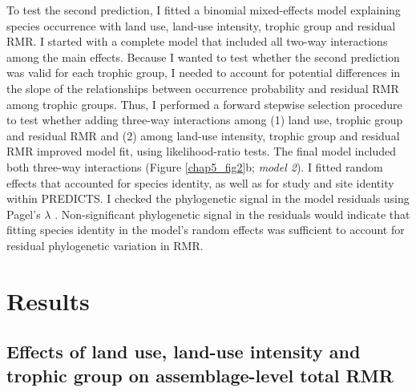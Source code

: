 To test the second prediction, I fitted a binomial mixed-effects model explaining species occurrence with land use, land-use intensity, trophic group and residual RMR. I started with a complete model that included all two-way interactions among the main effects. Because I wanted to test whether the second prediction was valid for each trophic group, I needed to account for potential differences in the slope of the relationships between occurrence probability and residual RMR among trophic groups. Thus, I performed a forward stepwise selection procedure to test whether adding three-way interactions among (1) land use, trophic group and residual RMR and (2) among land-use intensity, trophic group and residual RMR improved model fit, using likelihood-ratio tests. The final model included both three-way interactions (Figure \ref{chap5_fig2}b; \textit{model 2}). I fitted random effects that accounted for species identity, as well as for study and site identity within PREDICTS. I checked the phylogenetic signal in the model residuals using Pagel’s $\lambda$ \citep{Pagel1999}. Non-significant phylogenetic signal in the residuals would indicate that fitting species identity in the model’s random effects was sufficient to account for residual phylogenetic variation in RMR.



\section{Results}

\subsection{Effects of land use, land-use intensity and trophic group on assemblage-level total RMR}

